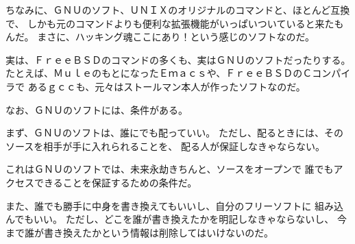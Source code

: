 \documentclass[12pt]{jarticle}
\begin{document}
ちなみに、ＧＮＵのソフト、ＵＮＩＸのオリジナルのコマンドと、ほとんど互換で、
しかも元のコマンドよりも便利な拡張機能がいっぱいついていると来たもんだ。
まさに、ハッキング魂ここにあり！という感じのソフトなのだ。

実は、ＦｒｅｅＢＳＤのコマンドの多くも、実はＧＮＵのソフトだったりする。
たとえば、ＭｕｌｅのもとになったＥｍａｃｓや、ＦｒｅｅＢＳＤのＣコンパイラで
あるｇｃｃも、元々はストールマン本人が作ったソフトなのだ。

\bigskip

なお、ＧＮＵのソフトには、条件がある。

まず、ＧＮＵのソフトは、誰にでも配っていい。
ただし、配るときには、そのソースを相手が手に入れられることを、
配る人が保証しなきゃならない。

これはＧＮＵのソフトでは、未来永劫きちんと、ソースをオープンで
誰でもアクセスできることを保証するための条件だ。

また、誰でも勝手に中身を書き換えてもいいし、自分のフリーソフトに
組み込んでもいい。
ただし、どこを誰が書き換えたかを明記しなきゃならないし、
今まで誰が書き換えたかという情報は削除してはいけないのだ。
\end{document}
